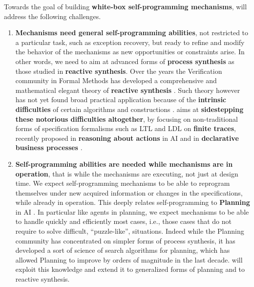 Towards the goal of building \textbf{white-box self-programming mechanisms}, \project will address the following challenges.
\begin{enumerate}

\item \textbf{Mechanisms need general self-programming abilities}, not
  restricted to a particular task, such as exception recovery, but ready
  to refine and modify the behavior of the mechanisms as new
  opportunities or constraints arise. In other words, we need to aim at                           
  advanced forms of \textbf{process synthesis} as those studied in
  \textbf{reactive synthesis}.  Over the years the Verification
  community in Formal Methods has developed a comprehensive and
  mathematical elegant theory of \textbf{reactive synthesis}
  \autocite[]{PnRo89}.  Such theory however has not yet found broad practical
  application because of the \textbf{intrinsic difficulties} of
  certain algorithms and constructions \autocite[]{TsaiFVT14}.
  \project aims at \textbf{sidestepping these notorious difficulties
    altogether}, by focusing on non-traditional forms of
  specification formalisms such as LTL and LDL on \textbf{finite
    traces}, recently proposed in \textbf{reasoning about actions} in
  AI \autocite[]{TorresB15} \autocite[]{DeVa15} %
and in \textbf{declarative business
    processes} \autocite[]{AalstPS09}.



\item \textbf{Self-programming abilities are needed while mechanisms are in operation}, that is while the mechanisms are executing, not just at  design time. We expect self-programming mechanisms to be able to reprogram themselves under new acquired information or changes in the specifications, while already in operation. This deeply relates self-programming to \textbf{Planning} in AI \autocite[]{GeffnerBo13}. %
In particular like agents in planning, we expect mechanisms to be able to handle quickly and efficiently most cases, i.e., those cases that do not require to solve difficult, ``puzzle-like'', situations. Indeed while the Planning community has concentrated on simpler forms of process synthesis, it has developed a sort of science of search algorithms for planning, which has allowed Planning to improve by orders of magnitude in the last decade. \autocite[]{PommereningHB17} \autocite[]{SteinmetzH17} %
\autocite[]{DeGMMP17} \project will exploit this knowledge and extend it to generalized forms of planning and to reactive synthesis.



\end{enumerate}

